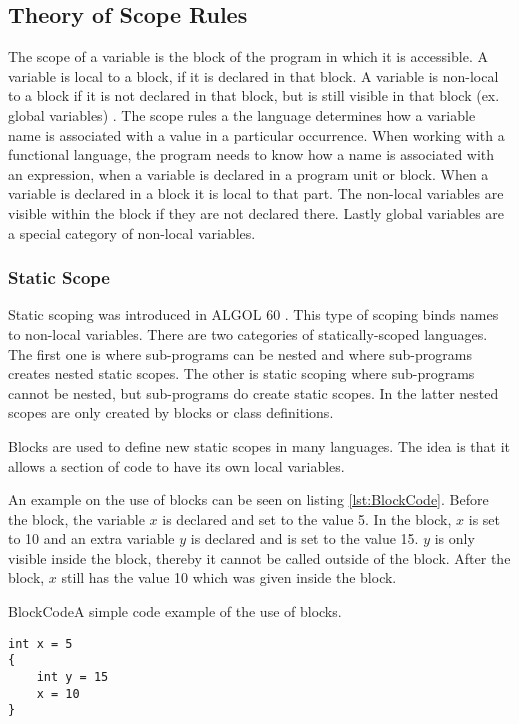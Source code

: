 \subsection{Theory of Scope Rules}
\label{sec:scoperules}
The scope of a variable is the block of the program in which it is accessible. A variable is local to a block, if it is declared in that block. A variable is non-local to a block if it is not declared in that block, but is still visible in that block (ex. global variables) \citep{sebesta}.
The scope rules a the language determines how a variable name is associated with a value in a particular occurrence. When working with a functional language, the program needs to know how a name is associated with an expression, when a variable is declared in a program unit or block. When a variable is declared in a block it is local to that part. The non-local variables are visible within the block if they are not declared there. Lastly global variables are a special category of non-local variables.

\subsubsection{Static Scope}
Static scoping was introduced in ALGOL 60 \citep{sebesta}. This type of scoping binds names to non-local variables. There are two categories of statically-scoped languages. The first one is where sub-programs can be nested and where sub-programs creates nested static scopes. The other is static scoping where sub-programs cannot be nested, but sub-programs do create static scopes. In the latter nested scopes are only created by blocks or class definitions.

Blocks are used to define new static scopes in many languages. The idea is that it allows a section of code to have its own local variables.

An example on the use of blocks can be seen on listing \ref{lst:BlockCode}. Before the block, the variable $x$ is declared and set to the value 5. In the block, $x$ is set to 10 and an extra variable $y$ is declared and is set to the value 15. $y$ is only visible inside the block, thereby it cannot be called outside of the block. After the block, $x$ still has the value 10 which was given inside the block.

\begin{code}{BlockCode}{A simple code example of the use of blocks.}
\begin{lstlisting}
int x = 5
{
    int y = 15
    x = 10
} 
\end{lstlisting}
\end{code}

